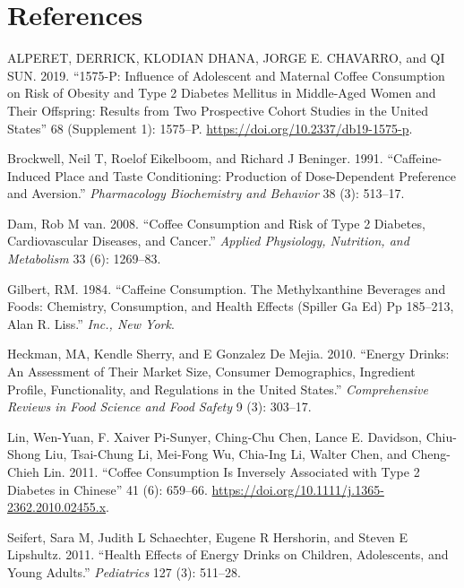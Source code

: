\documentclass{scrartcl}
\begin{document}
\section*{References}
\label{sec:orgf95e74b}
\begin{hangparas}{1.5em}{1}
\hypertarget{citeproc_bib_item_1}{ALPERET, DERRICK, KLODIAN DHANA, JORGE E. CHAVARRO, and QI SUN. 2019. “1575-P: Influence of Adolescent and Maternal Coffee Consumption on Risk of Obesity and Type 2 Diabetes Mellitus in Middle-Aged Women and Their Offspring: Results from Two Prospective Cohort Studies in the United States” 68 (Supplement 1): 1575–P. \href{https://doi.org/10.2337/db19-1575-p}{https://doi.org/10.2337/db19-1575-p}.}

\hypertarget{citeproc_bib_item_2}{Brockwell, Neil T, Roelof Eikelboom, and Richard J Beninger. 1991. “Caffeine-Induced Place and Taste Conditioning: Production of Dose-Dependent Preference and Aversion.” \textit{Pharmacology Biochemistry and Behavior} 38 (3): 513–17.}

\hypertarget{citeproc_bib_item_3}{Dam, Rob M van. 2008. “Coffee Consumption and Risk of Type 2 Diabetes, Cardiovascular Diseases, and Cancer.” \textit{Applied Physiology, Nutrition, and Metabolism} 33 (6): 1269–83.}

\hypertarget{citeproc_bib_item_4}{Gilbert, RM. 1984. “Caffeine Consumption. The Methylxanthine Beverages and Foods: Chemistry, Consumption, and Health Effects (Spiller Ga Ed) Pp 185–213, Alan R. Liss.” \textit{Inc., New York}.}

\hypertarget{citeproc_bib_item_5}{Heckman, MA, Kendle Sherry, and E Gonzalez De Mejia. 2010. “Energy Drinks: An Assessment of Their Market Size, Consumer Demographics, Ingredient Profile, Functionality, and Regulations in the United States.” \textit{Comprehensive Reviews in Food Science and Food Safety} 9 (3): 303–17.}

\hypertarget{citeproc_bib_item_6}{Lin, Wen-Yuan, F. Xaiver Pi-Sunyer, Ching-Chu Chen, Lance E. Davidson, Chiu-Shong Liu, Tsai-Chung Li, Mei-Fong Wu, Chia-Ing Li, Walter Chen, and Cheng-Chieh Lin. 2011. “Coffee Consumption Is Inversely Associated with Type 2 Diabetes in Chinese” 41 (6): 659–66. \href{https://doi.org/10.1111/j.1365-2362.2010.02455.x}{https://doi.org/10.1111/j.1365-2362.2010.02455.x}.}

\hypertarget{citeproc_bib_item_7}{Seifert, Sara M, Judith L Schaechter, Eugene R Hershorin, and Steven E Lipshultz. 2011. “Health Effects of Energy Drinks on Children, Adolescents, and Young Adults.” \textit{Pediatrics} 127 (3): 511–28.}


\end{hangparas}
\end{document}
